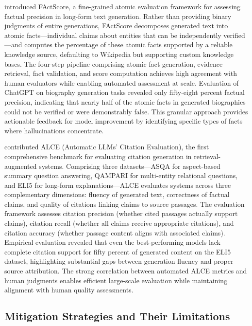 \documentclass[11pt,letterpaper]{article}
\begin{document}
\cite{min2023factscore} introduced FActScore, a fine-grained atomic evaluation framework for assessing factual precision in long-form text generation. Rather than providing binary judgments of entire generations, FActScore decomposes generated text into atomic facts---individual claims about entities that can be independently verified---and computes the percentage of these atomic facts supported by a reliable knowledge source, defaulting to Wikipedia but supporting custom knowledge bases. The four-step pipeline comprising atomic fact generation, evidence retrieval, fact validation, and score computation achieves high agreement with human evaluators while enabling automated assessment at scale. Evaluation of ChatGPT on biography generation tasks revealed only fifty-eight percent factual precision, indicating that nearly half of the atomic facts in generated biographies could not be verified or were demonstrably false. This granular approach provides actionable feedback for model improvement by identifying specific types of facts where hallucinations concentrate.

\cite{gao2023enabling} contributed ALCE (Automatic LLMs' Citation Evaluation), the first comprehensive benchmark for evaluating citation generation in retrieval-augmented systems. Comprising three datasets---ASQA for aspect-based summary question answering, QAMPARI for multi-entity relational questions, and ELI5 for long-form explanations---ALCE evaluates systems across three complementary dimensions: fluency of generated text, correctness of factual claims, and quality of citations linking claims to source passages. The evaluation framework assesses citation precision (whether cited passages actually support claims), citation recall (whether all claims receive appropriate citations), and citation accuracy (whether passage content aligns with associated claims). Empirical evaluation revealed that even the best-performing models lack complete citation support for fifty percent of generated content on the ELI5 dataset, highlighting substantial gaps between generation fluency and proper source attribution. The strong correlation between automated ALCE metrics and human judgments enables efficient large-scale evaluation while maintaining alignment with human quality assessments.

\subsection{Mitigation Strategies and Their Limitations}
\end{document}
